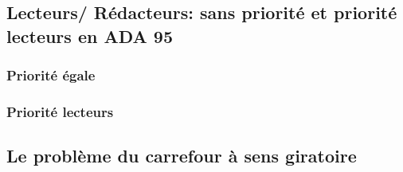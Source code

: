 \documentclass[11pt,a4paper]{article}
\begin{document}
\subsection{Lecteurs/ Rédacteurs: sans priorité et priorité lecteurs en ADA 95}
\subsubsection{Priorité égale}
\begin{scriptsize}
    
\end{scriptsize}
\newpage
\subsubsection{Priorité lecteurs}
\begin{scriptsize}
    
\end{scriptsize}
\newpage
\subsection{Le problème du carrefour à sens giratoire}
\begin{scriptsize}
    
\end{scriptsize}
\end{document}
